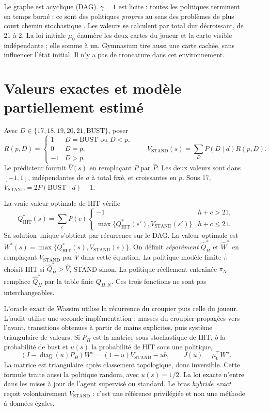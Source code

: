 \documentclass[11pt,a4paper]{article}
\theoremstyle{remark}\newtheorem*{remarque}{Remarque}
\newcommand{\1}{\mathbf 1}
\newcommand{\VS}{V_{\mathrm{STAND}}}
\newcommand{\QH}{Q^*_{\mathrm{HIT}}}
\begin{document}
Le graphe est acyclique (DAG). $\gamma=1$ est licite : toutes les politiques
terminent en temps borné ; ce sont des politiques \emph{propres} au sens des
problèmes de plus court chemin stochastique \cite{puterman}. Les valeurs se calculent par total dur décroissant,
de 21 à 2. La loi initiale $\mu_0$ énumère les deux cartes du joueur et la carte
visible indépendante ; elle somme à un. Gymnasium tire aussi une carte cachée,
sans influencer l'état initial. Il n'y a pas de troncature dans cet environnement.

\section{Valeurs exactes et modèle partiellement estimé}
Avec $D\in\{17,18,19,20,21,\mathrm{BUST}\}$, poser
\[
 R(p,D)=\begin{cases}1&D=\mathrm{BUST}\text{ ou }D<p,\\0&D=p,\\-1&D>p,\end{cases}
 \qquad \VS(s)=\sum_D P(D\mid d)R(p,D).
\]
Le prédicteur fournit $\widehat V(s)$ en remplaçant $P$ par $\widehat P$.
Les deux valeurs sont dans $[-1,1]$, indépendantes de $a$ à total fixé,
et croissantes en $p$. Sous 17, $\VS=2P(\mathrm{BUST}\mid d)-1$.

La vraie valeur optimale de HIT vérifie
\begin{equation}\label{eq:bellman}
 \QH(s)=\sum_cP(c)\begin{cases}-1&h+c>21,\\
 \max\{\QH(s'),\VS(s')\}&h+c\le21.
 \end{cases}
\end{equation}
Sa solution unique s'obtient par récurrence sur le DAG. La valeur optimale
est $W^*(s)=\max\{\QH(s),\VS(s)\}$.
On définit \emph{séparément} $\widehat Q^*_H$ et $\widehat W^*$ en remplaçant
$\VS$ par $\widehat V$ dans cette équation. La politique modèle limite
$\widehat\pi$ choisit HIT si $\widehat Q^*_H>\widehat V$, STAND sinon.
La politique réellement entraînée $\pi_N$ remplace $\widehat Q^*_H$ par la
table finie $Q_{H,N}$. Ces trois fonctions ne sont pas interchangeables.

L'oracle exact de Wassim utilise la récurrence du croupier puis celle du joueur.
L'audit utilise une seconde implémentation : masses du croupier propagées vers
l'avant, transitions obtenues à partir de mains explicites, puis système
triangulaire de valeurs. Si $P_H$ est la matrice sous-stochastique de HIT,
$b$ la probabilité de bust et $u(s)$ la probabilité de HIT sous une politique,
\[
 (I-\operatorname{diag}(u)P_H)W^u=(1-u)\VS-u b,
 \qquad J(u)=\mu_0^\top W^u.
\]
La matrice est triangulaire après classement topologique, donc inversible.
Cette formule traite aussi la politique random, avec $u(s)=1/2$.
La loi exacte n'entre dans les mises à jour de l'agent supervisé ou standard.
Le bras \emph{hybride exact} reçoit volontairement $\VS$ : c'est une référence
privilégiée et non une méthode à données égales.
\end{document}
